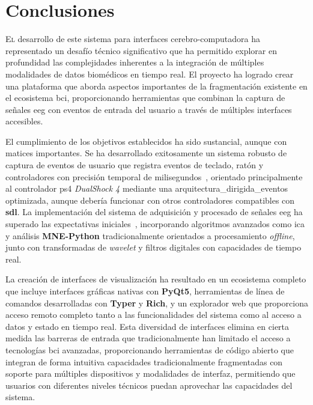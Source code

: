 {
\titlespacing*{\chapter}{0pt}{-0.1\textheight}{20pt}
\chapter{Conclusiones}
\label{chap:conclusions}
}

\lettrine{E}{l} desarrollo de este sistema para interfaces cerebro-computadora ha representado un desafío técnico significativo que ha permitido explorar en profundidad las complejidades inherentes a la integración de múltiples modalidades de datos biomédicos en tiempo real. El proyecto ha logrado crear una plataforma que aborda aspectos importantes de la fragmentación existente en el ecosistema \acrshort{bci}, proporcionando herramientas que combinan la captura de señales \acrshort{eeg} con eventos de entrada del usuario a través de múltiples interfaces accesibles.

El cumplimiento de los objetivos establecidos ha sido sustancial, aunque con matices importantes. Se ha desarrollado exitosamente un sistema robusto de captura de eventos de usuario que registra eventos de teclado, ratón y controladores con precisión temporal de milisegundos~\cite{Rakhmatulin2021}, orientado principalmente al controlador \acrshort{ps4} \textit{DualShock 4} mediante una \gls{arquitectura_dirigida_eventos} optimizada, aunque debería funcionar con otros controladores compatibles con \textbf{\acrshort{sdl}}. La implementación del sistema de adquisición y procesado de señales \acrshort{eeg} ha superado las expectativas iniciales~\cite{gramfort2013meg}, incorporando algoritmos avanzados como \acrshort{ica} y análisis \textbf{MNE-Python} tradicionalmente orientados a procesamiento \textit{offline}, junto con transformadas de \textit{\gls{wavelet}} y filtros digitales con capacidades de tiempo real.

La creación de interfaces de visualización ha resultado en un ecosistema completo que incluye interfaces gráficas nativas con \textbf{PyQt5}, herramientas de línea de comandos desarrolladas con \textbf{Typer} y \textbf{Rich}, y un explorador web que proporciona acceso remoto completo tanto a las funcionalidades del sistema como al acceso a datos y estado en tiempo real. Esta diversidad de interfaces elimina en cierta medida las barreras de entrada que tradicionalmente han limitado el acceso a tecnologías \acrshort{bci} avanzadas, proporcionando herramientas de código abierto que integran de forma intuitiva capacidades tradicionalmente fragmentadas con soporte para múltiples dispositivos y modalidades de interfaz, permitiendo que usuarios con diferentes niveles técnicos puedan aprovechar las capacidades del sistema.

